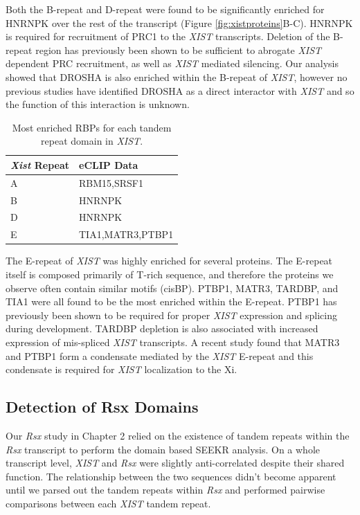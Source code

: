 Both the B-repeat and D-repeat were found to be significantly enriched for HNRNPK over the rest of the transcript (Figure \ref{fig:xistproteins}B-C). HNRNPK is required for recruitment of PRC1 to the \emph{XIST} transcripts. Deletion of the B-repeat region has previously been shown to be sufficient to abrogate \emph{XIST} dependent PRC recruitment, as well as \emph{XIST} mediated silencing. Our analysis showed that DROSHA is also enriched within the B-repeat of \emph{XIST}, however no previous studies have identified DROSHA as a direct interactor with \emph{XIST} and so the function of this interaction is unknown.

\begin{table}[h]
\centering
\begin{tabular}{|l|l|}
\hline 
\emph{Xist} Repeat&eCLIP Data                      \\
\hline 
    A&RBM15,SRSF1    \\
      B & HNRNPK\\
      D  & HNRNPK\\
      E & TIA1,MATR3,PTBP1\\
\hline 
\end{tabular}
\caption{Most enriched RBPs for each tandem repeat domain in \emph{XIST}. }
\label{tbl:eclipscan}
\end{table}

The E-repeat of \emph{XIST} was highly enriched for several proteins. The E-repeat itself is composed primarily of T-rich sequence, and therefore the proteins we observe often contain similar motifs (cisBP). PTBP1, MATR3, TARDBP, and TIA1 were all found to be the most enriched within the E-repeat. PTBP1 has previously been shown to be required for proper \emph{XIST} expression and splicing during development. TARDBP depletion is also associated with increased expression of mis-spliced \emph{XIST} transcripts. A recent study found that MATR3 and PTBP1 form a condensate mediated by the \emph{XIST} E-repeat and this condensate is required for \emph{XIST} localization to the Xi. 

\subsection{Detection of Rsx Domains}
Our \emph{Rsx} study in Chapter 2 relied on the existence of tandem repeats within the \emph{Rsx} transcript to perform the domain based SEEKR analysis. On a whole transcript level, \emph{XIST} and \emph{Rsx} were slightly anti-correlated despite their shared function. The relationship between the two sequences didn't become apparent until we parsed out the tandem repeats within \emph{Rsx} and performed pairwise comparisons between each \emph{XIST} tandem repeat. 

